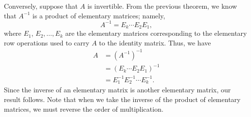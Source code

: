 Conversely, suppose that $A$ is invertible. From the previous theorem, we know that $A^{-1}$ is a product of elementary matrices; namely, 
\[
A^{-1} = E_k\cdots E_2E_1,
\]
where $E_1$, $E_2, \ldots, E_k$ are the elementary matrices corresponding to the elementary row operations used to carry $A$ to the identity matrix. Thus, we have
\begin{align*}
A & = (A^{-1})^{-1}\\
& = (E_k\cdots E_2E_1)^{-1}\\
& = E_1^{-1}E_2^{-1}\cdots E_k^{-1}.
\end{align*}
Since the inverse of an elementary matrix is another elementary matrix, our result follows. Note that when we take the inverse of the product of elementary matrices, we must reverse the order of multiplication.\\

\pagebreak


